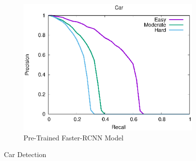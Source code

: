 \begin{figure}[H]
\begin{subfigure}{.34\textwidth}
    \includegraphics[width=1.0\linewidth]{img/FRCNN_Nov_8/plot_valid/car_detection.eps}
    \caption{Pre-Trained Faster-RCNN Model}
\end{subfigure}
\caption{Car Detection}
\end{figure}

